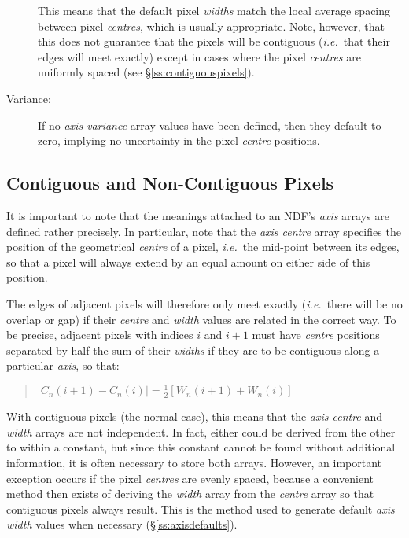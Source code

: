 \documentclass[twoside,11pt,nolof]{starlink}
\providecommand{\st}[1]{{\emph{#1}}}
\begin{document}
\begin{description}
This means that the default pixel \st{widths\/} match the local average
spacing between pixel \st{centres\/}, which is usually appropriate.
Note, however, that this does not guarantee that the pixels will be
contiguous (\st{i.e.}\ that their edges will meet exactly) except in cases
where the pixel \st{centres\/} are uniformly spaced (see
\S\ref{ss:contiguouspixels}).

\item[Variance:]
If no \st{axis variance\/} array values have been defined, then they
default to zero, implying no uncertainty in the pixel \st{centre\/}
positions.

\end{description}

\subsection{\label{ss:contiguouspixels}Contiguous and Non-Contiguous Pixels}

It is important to note that the meanings attached to an NDF's \st{axis\/}
arrays are defined rather precisely.
In particular, note that the \st{axis centre\/} array specifies the
position of the \underline{geometrical} \st{centre\/} of a pixel,
\st{i.e.}\ the mid-point between its edges, so that a pixel will
always extend
by an equal amount on either side of this position.

The edges of adjacent pixels will therefore only meet exactly
(\st{i.e.}\ there will be no overlap or gap) if their \st{centre\/}
and \st{width\/} values are related in the correct way.
To be precise, adjacent pixels with indices $i$ and $i+1$ must have
\st{centre\/} positions separated by half the sum of their \st{widths\/} if
they are to be contiguous along a particular \st{axis}, so that:

\small
\begin{quote}
\begin{center}
$|C_{n}(i+1) - C_{n}(i)| = \frac{1}{2} [W_{n}(i+1) + W_{n}(i)]$
\end{center}
\end{quote}
\normalsize

With contiguous pixels (the normal case), this means that the \st{axis
centre\/} and \st{width\/} arrays are not independent.
In fact, either could be derived from the other to within a constant,
but since this constant cannot be found without additional information,
it is often necessary to store both arrays.
However, an important exception occurs if the pixel \st{centres\/} are
evenly spaced, because a convenient method then exists of deriving the
\st{width\/} array from the \st{centre\/} array so that contiguous
pixels
always result.
This is the method used to generate default \st{axis width\/} values when
necessary (\S\ref{ss:axisdefaults}).
\end{document}
